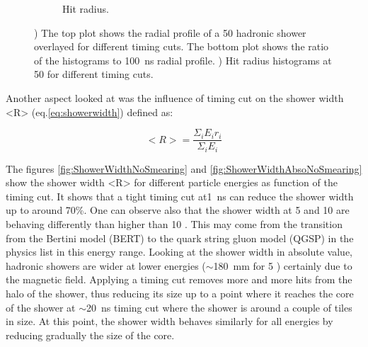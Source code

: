 \begin{figure}[t]
\begin{subfigure}[t]{0.45\textwidth}
    \caption{Hit radius.} \label{fig:HitRadiusSmearing}
  \end{subfigure}
  \caption{) The top plot shows the radial profile of a 50 \GeV hadronic shower overlayed for different timing cuts. The bottom plot shows the ratio of the histograms to \SI{100}{\nano\second} radial profile. ) Hit radius histograms at 50 \GeV for different timing cuts.}
\end{figure}

Another aspect looked at was the influence of timing cut on the shower width <R> (eq.\ref{eq:showerwidth}) defined as:

\begin{equation} \label{eq:showerwidth}
  <R> = \frac{\Sigma_i E_i r_i}{\Sigma_i E_i}
\end{equation}
\vspace{1ex}

The figures \ref{fig:ShowerWidthNoSmearing} and \ref{fig:ShowerWidthAbsoNoSmearing} show the shower width <R> for different particle energies as function of the timing cut. It shows that a tight timing cut at\SI{1}{\nano\second} can reduce the shower width up to around 70\%. One can observe also that the shower width at 5 and 10 \GeV are behaving differently than higher than 10 \GeV. This may come from the transition from the Bertini model (BERT) to the quark string gluon model (QGSP) in the physics list in this energy range. Looking at the shower width in absolute value, hadronic showers are wider at lower energies ($\sim$\SI{180}{\milli\meter} for 5 \GeV) certainly due to the magnetic field. Applying a timing cut removes more and more hits from the halo of the shower, thus reducing its size up to a point where it reaches the core of the shower at $\sim$\SI{20}{\nano\second} timing cut where the shower is around a couple of tiles in size. At this point, the shower width behaves similarly for all energies by reducing gradually the size of the core.

